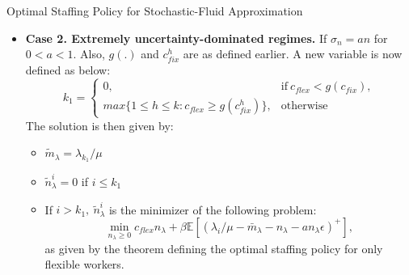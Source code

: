\documentclass[8pt]{beamer}
\begin{document}
\begin{frame}{Optimal Staffing Policy for Stochastic-Fluid Approximation}
\begin{theorem}
\begin{itemize}
    \item \textbf{Case 2. Extremely uncertainty-dominated
regimes.}  If $\sigma_n = an$ for $0 < a < 1$. Also, $g(.)$ and $c_{fix}^h$ are as defined earlier. A new variable is now defined as below:
$$
k_1 = 
\begin{cases}
      0, & \text{if}\ c_{flex} < g(c_{fix}), \\
      max\{1 \leq h \leq k: c_{flex} \geq g(c_{fix}^h)\}, & \text{otherwise}
    \end{cases}
$$
The solution is then given by:
\begin{itemize}
    \item $\tilde{m}_{\lambda}=\lambda_{k_1}/\mu$
    \item $\tilde{n}_{\lambda}^i=0$ if $i \leq k_1$
    \item If $i>k_1, \ \tilde{n}_{\lambda}^i$ is the minimizer of the following problem:
    \[\min_{n_{\lambda}\geq0} c_{flex}n_{\lambda} + \beta\mathbb{E}[(\lambda_i/\mu - \bar{m}_{\lambda} - n_{\lambda} -an_{\lambda}\epsilon)^+],\]
    as given by the theorem defining the optimal staffing policy for only flexible workers.
\end{itemize}
\end{itemize}
\end{theorem}
\end{frame}
\end{document}
